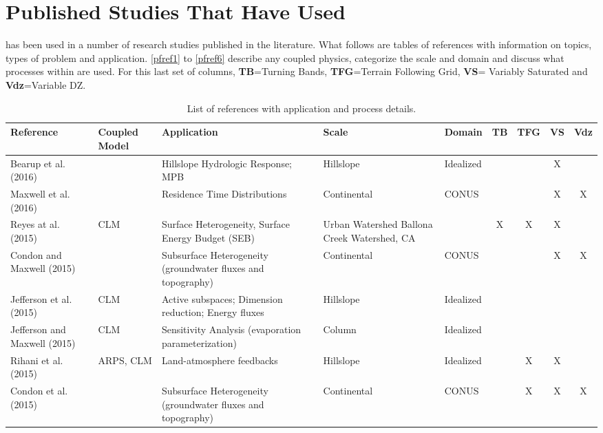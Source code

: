 \section{Published Studies That Have Used \parflow{}}
\label{lit_table}

\parflow{} has been used in a number of research studies published in the literature. 
What follows are tables of \parflow{} references with information on topics, types of problem and
application.  \ref{pfref1} to \ref{pfref6} describe any coupled physics, 
categorize the scale and domain and discuss what processes within \parflow{} are used.  For this last
set of columns, {\bf TB}=Turning Bands, {\bf TFG}=Terrain Following Grid, {\bf VS}= Variably Saturated
and {\bf Vdz}=Variable DZ.\\
\newpage

{\scriptsize
\begin{table}
\renewcommand{\arraystretch}{2.5}
\center
\caption{List of \parflow{} references with application and process details.}
\begin{tabular}{ l  p{1.5cm} p{2cm} p{1.5cm} p{1.5cm} | c | c | c | c }
\bf{Reference} & \bf{Coupled Model} & \bf{Application} & \bf{Scale} & \bf{Domain} & \bf{TB} & \bf{TFG} & \bf{VS} & \bf{Vdz} \\ 
\hline{}
\cite{Bearup2016}   Bearup et al. (2016) & & Hillslope Hydrologic Response; MPB & Hillslope     & Idealized & & & X & \\
\cite{Maxwell2016} Maxwell et al. (2016) & & Residence Time Distributions       & Continental	& CONUS     & & & X & X \\	
\cite{Reyes2015} Reyes at al. (2015)     & CLM & Surface Heterogeneity, Surface Energy Budget (SEB) & Urban Watershed Ballona Creek Watershed, CA  & & X&X &X  \\
\cite{Condon2015a} Condon and Maxwell (2015) & & Subsurface Heterogeneity (groundwater fluxes and topography) & Continental & CONUS  & & & X & X \\
\cite{Jefferson2015} Jefferson et al. (2015) & CLM & Active subspaces; Dimension reduction; Energy fluxes & Hillslope & Idealized   & & & & \\ 				
\cite{Jefferson2015a} Jefferson and Maxwell (2015)& CLM & Sensitivity Analysis (evaporation parameterization) & Column & Idealized   & & & & \\ 				
\cite{Rihani2015} Rihani et al. (2015) & ARPS, CLM & Land-atmosphere feedbacks & Hillslope & Idealized      & & X & X & \\
\cite{Condon2015} Condon et al. (2015) & & Subsurface Heterogeneity (groundwater fluxes and topography) & Continental & CONUS & &X &X & X  \\			

\end{tabular}
\end{table}}

